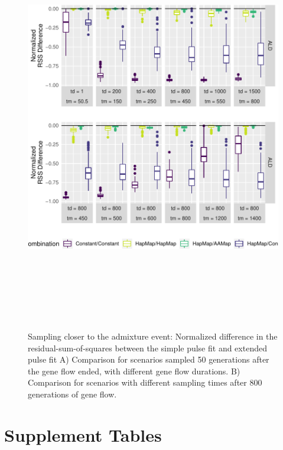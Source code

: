\documentclass[11pt]{article}
\begin{document}
\begin{figure}
\centering
\includegraphics[width=16cm,height=18cm,keepaspectratio]{ATE_Revisions_files/figure-latex/figCloser_Sampling_RSS_Supplement-1.pdf}
\caption{\label{fig:figResult3_4_supplements} Sampling closer to the admixture event: Normalized difference in the residual-sum-of-squares between the simple pulse fit and extended pulse fit A) Comparison for scenarios sampled 50 generations after the gene flow ended, with different gene flow durations. B)
Comparison for scenarios with different sampling times after 800 generations of gene flow.}
\end{figure}

\section{Supplement Tables}
\end{document}
